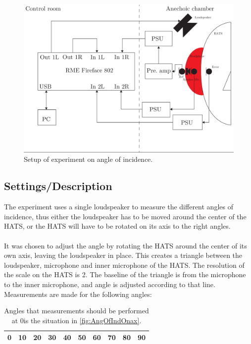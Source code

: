 \begin{figure}[H]
	\centering
	\includegraphics[width=\textwidth]{../Journal/Experiments/AngleOfIncidence/AngleOfIncidenceSetup.pdf}
	\caption{Setup of experiment on angle of incidence.}
	\label{Fig:AngleOfIncidenceSetup}
\end{figure}



\subsection{Settings/Description}\label{sec:AngleDescription}
The experiment uses a single loudspeaker to measure the  different angles of incidence, thus either the loudspeaker has to be moved around the center of the HATS, or the HATS will have to be rotated on its axis to the right angles. \\\\
It was chosen to adjust the angle by rotating the HATS around the center of its own axis, leaving the loudspeaker in place. This creates a triangle between the loudspeaker, microphone and inner microphone of the HATS. The resolution of the scale on the HATS is 2\degrees. The baseline of the triangle is from the microphone to the inner microphone, and angle is adjusted according to that line.
Measurements are made for the following angles:
\begin{table}[H]
	\centering
	\begin{tabular}{c c c c c c c c c c} \toprule
		0\degrees & 10\degrees & 20\degrees & 30\degrees & 40\degrees & 50\degrees & 60\degrees & 70\degrees & 80\degrees & 90\degrees \\ \bottomrule
	\end{tabular}
\caption{Angles that measurements should be performed at 0\degrees  is the situation in \autoref{fig:AngOfIndOnax}.}
\label{Tab:AngleOfInciMeasAngles}
\end{table}
 

